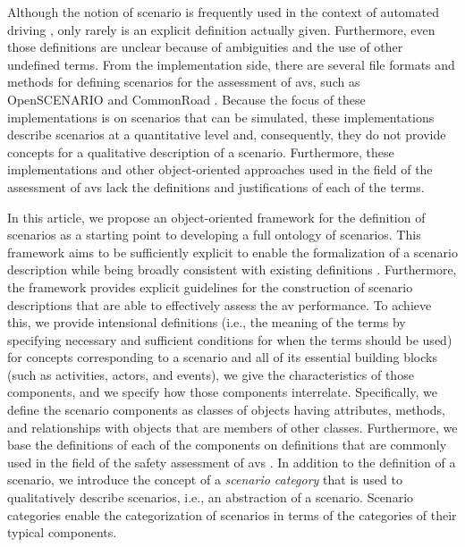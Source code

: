 Although the notion of scenario is frequently used in the context of automated driving \autocite{gietelink2006development, ebner2011identifying, hulshof2013autonomous, xiong2015orchestration, zofka2015datadrivetrafficscenarios, putz2017pegasus, roesener2017comprehensive, ploeg2017GCDC, shao2019evaluating}, \cendc\cstartd only rarely is an explicit definition actually given. 
Furthermore, even those definitions are unclear because of ambiguities and the use of other undefined terms. \cendd
\cstartc From the implementation side, there are several file formats and methods for defining scenarios for the assessment of \acp{av}, such as OpenSCENARIO \autocite{openscenario} and CommonRoad \autocite{althoff2017CommonRoad}.
Because the focus of these implementations is on scenarios that can be simulated, these implementations describe scenarios at a quantitative level and, consequently, they do not provide concepts for a qualitative description of a scenario.
Furthermore, these implementations and other object-oriented approaches used in the field of the assessment of \acp{av} \autocite{tsai2003scenario, utting2012taxonomy, zofka2016testing, wittmann2017method} lack the definitions and justifications of each of the terms.

In this article, we propose an object-oriented framework for the definition of scenarios \cendc\cstartd as a starting point to developing a full ontology of scenarios. 
This framework aims to be sufficiently explicit to enable the formalization of a scenario description while being broadly consistent with existing definitions \autocite{geyer2014, ulbrich2015, elrofai2016scenario}. \cendd\cstartc 
Furthermore, the framework provides explicit guidelines for the construction of scenario descriptions that are able to effectively assess the \ac{av} performance.
To achieve this, \cendc\cstartd we provide intensional definitions (i.e., the meaning of the terms by specifying necessary and sufficient conditions for when the terms should be used) for concepts corresponding to a scenario and all of its \cendd\cstartc essential building blocks (such as activities, actors, and events), \cendc\cstartd we give \cendd\cstartc the characteristics of those components, and \cendc\cstartd we specify \cendd\cstartc how those components interrelate. 
\cendc\cstartd Specifically, we define the scenario components \cendd\cstartc as classes of objects having attributes, methods, and relationships with objects that are members of other classes.
\cendc\cstartd Furthermore, we base the definitions of each of the components on definitions \cendd\cstartc that are commonly used in the field of the safety assessment of \acp{av} \autocite{geyer2014, ulbrich2015, catapult2018musicc, catapult2018regulating, sigsim2019glossary, openscenario}. 
In addition to the definition of a scenario, we introduce the concept of a \emph{scenario category} that is used to qualitatively describe scenarios, i.e., an abstraction of a scenario. Scenario categories enable the categorization of scenarios in terms of the categories of their typical components.

